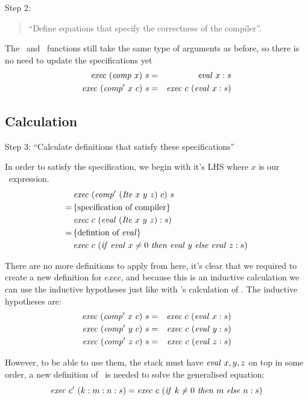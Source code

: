 \documentclass {article}
\begin{document}
Step 2: 
\begin{quote}
``Define equations that specify the correctness of the compiler''.
\end{quote}
The \exec\ and \comp\ functions still take the same
type of arguments as before,
so there is no need to update the specifications yet
\begin{eqnarray*}
\mathit{exec\ }  (\mathit{comp\ }  x)\  s &=& \mathit{eval\ }   x:s \label{spec1.2}\\
\mathit{exec\ }  (\mathit{comp'\ }   x\  c)\ s &=& \mathit{exec\ }  c\  (\mathit{eval\ }  x:s) \label{spec2.2}
\end{eqnarray*}

\subsection{Calculation} \label{itecalc}

Step 3: ``Calculate definitions that 
		satisfy these specifications''

In order to satisfy the specification,
we begin with it's LHS where $x$ is our
\ite\ expression.
\begin{align*}
	&\Exec (\Compp  (\Ite x\ y\ z)\ c)\ s \\
	=\, & \{ \mbox{specification of compiler} \} \\
	&\Exec c\ (\evalf  (\Ite x\ y\ z) : s) \\
	=\, & \{\mbox{defintion of \eval}\} \\
	&\Exec c\ (\ifff \evalf x \not= 0\ 
		\tthen \evalf y\ \eelse  \evalf z : s)
\end{align*}

There are no more definitions to apply from here,
it's clear that we required to
create a new definition for $exec$,
and because this is an inductive calculation
we can use the inductive hypotheses
just like with \BH's calculation of \add.
The inductive hypotheses are:
\begin{eqnarray*}
	\mathit{exec\ } (\mathit{comp'\ }  x\ c)\ s &=& \mathit{exec\ } c\ (\mathit{eval\ } x:s) \\
	\mathit{exec\ } (\mathit{comp'\ }  y\ c)\ s &=& \mathit{exec\ } c\ (\mathit{eval\ } y:s) \\
	\mathit{exec\ } (\mathit{comp'\ }  z\ c)\ s &=& \mathit{exec\ } c\ (\mathit{eval\ } z:s)
\end{eqnarray*}

However, to be able to use them,
the stack must have 
$\mathit{eval\ } x,y,z$ on top in some order,
a new definition of \exec\ is needed to 
solve the generalised equation:
\[ \mathit{exec\ } c'\ (k:m:n:s) 
	= \mathit{exec\ } c\ (\mathit{if\ } k \not= 0\ \mathit{then\ } m\ \mathit{else\ }  n : s)\]
\end{document}
